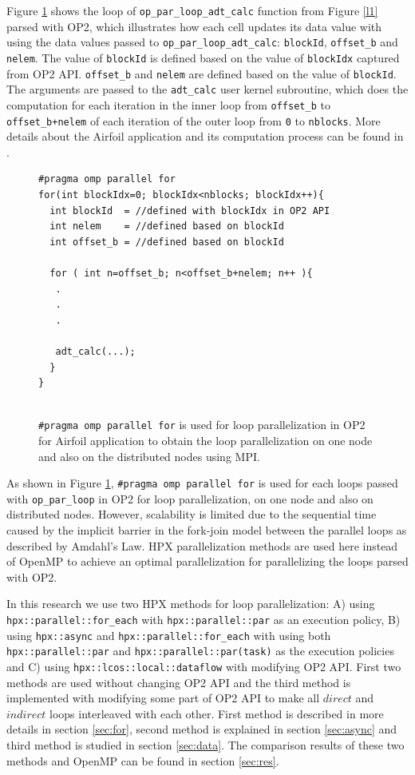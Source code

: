 \documentclass[conference]{IEEEtran}
\begin{document}
Figure \ref{l2} shows the loop of \texttt{op\_par\_loop\_adt\_calc} function from Figure \ref{l1} parsed with OP2, which illustrates how each cell updates its data value with using the data values passed to \texttt{op\_par\_loop\_adt\_calc}: \texttt{blockId}, \texttt{offset\_b} and \texttt{nelem}. The value of \texttt{blockId} is defined based on the value of \texttt{blockIdx} captured from OP2 API.  \texttt{offset\_b} and \texttt{nelem} are defined based on the value of \texttt{blockId}. The arguments are passed to the \texttt{adt\_calc} user kernel subroutine, which does the computation for each iteration in the inner loop from \texttt{offset\_b} to \texttt{offset\_b+nelem} of each iteration of the outer loop from \texttt{0} to \texttt{nblocks}. More details about the Airfoil application and its computation process can be found in \cite{o8}.

\begin{figure} [!h]
    \begin{lstlisting}
#pragma omp parallel for
for(int blockIdx=0; blockIdx<nblocks; blockIdx++){
  int blockId  = //defined with blockIdx in OP2 API
  int nelem    = //defined based on blockId 
  int offset_b = //defined based on blockId
        
  for ( int n=offset_b; n<offset_b+nelem; n++ ){
   .
   .
   .

   adt_calc(...);
  }
}
  
    \end{lstlisting}
    \caption{\small{\texttt{\#pragma omp parallel for} is used for loop parallelization in OP2 for Airfoil application to obtain the loop parallelization on one node and also on the distributed nodes using MPI.}}
    \label{l2}
\end{figure}


As shown in Figure \ref{l2}, \texttt{\#pragma omp parallel for} is used for each loops passed with \texttt{op\_par\_loop} in OP2 for loop parallelization, on one node and also on distributed nodes. However, scalability is limited due to the sequential time  caused by the implicit barrier in the fork-join model \cite{r23} between the parallel loops as described by Amdahl's Law. HPX parallelization methods are used here instead of OpenMP to achieve an optimal parallelization for parallelizing the loops parsed with OP2. 

In this research we use two HPX methods for loop parallelization: A) using \texttt{hpx::parallel::for\_each} with \texttt{hpx::parallel::par} as an execution policy, B) using \texttt{hpx::async} and \texttt{hpx::parallel::for\_each} with using both \texttt{hpx::parallel::par} and \texttt{hpx::parallel::par(task)} as the execution policies and C) using \texttt{hpx::lcos::local::dataflow} with modifying OP2 API. First two methods are used without changing OP2 API and the third method is implemented with modifying some part of OP2 API to make all $direct$ and $indirect$ loops interleaved with each other. First method is described in more details in section \ref{sec:for}, second method is explained in section \ref{sec:async} and third method is studied in section \ref{sec:data}. The comparison results of these two methods and OpenMP can be found in section \ref{sec:res}.
\end{document}

